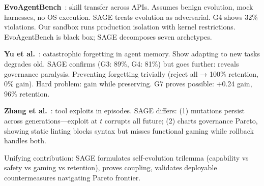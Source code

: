 \documentclass[conference]{IEEEtran}
\begin{document}
\textbf{EvoAgentBench}~\cite{gao2026evoagentbench}: skill transfer across APIs. Assumes benign evolution, mock harnesses, no OS execution. SAGE treats evolution as adversarial. G4 shows 32\% violations. Our sandbox runs production isolation with kernel restrictions. EvoAgentBench is black box; SAGE decomposes seven archetypes.

\textbf{Yu et al.}~\cite{yu2026forgetting}: catastrophic forgetting in agent memory. Show adapting to new tasks degrades old. SAGE confirms (G3: 89\%, G4: 81\%) but goes further: reveals governance paralysis. Preventing forgetting trivially (reject all → 100\% retention, 0\% gain). Hard problem: gain while preserving. G7 proves possible: +0.24 gain, 96\% retention.

\textbf{Zhang et al.}~\cite{zhang2026reward}: tool exploits in episodes. SAGE differs: (1) mutations persist across generations—exploit at $t$ corrupts all future; (2) charts governance Pareto, showing static linting blocks syntax but misses functional gaming while rollback handles both.

Unifying contribution: SAGE formulates self-evolution trilemma (capability vs safety vs gaming vs retention), proves coupling, validates deployable countermeasures navigating Pareto frontier.

\begin{table}[t]
\centering
\small
\caption{SAGE vs concurrent (2025-26). Horizon, state, failures, probes, types, sandbox, guards.}
\label{tab:concurrent_benchmarks}
\end{table}
\end{document}
